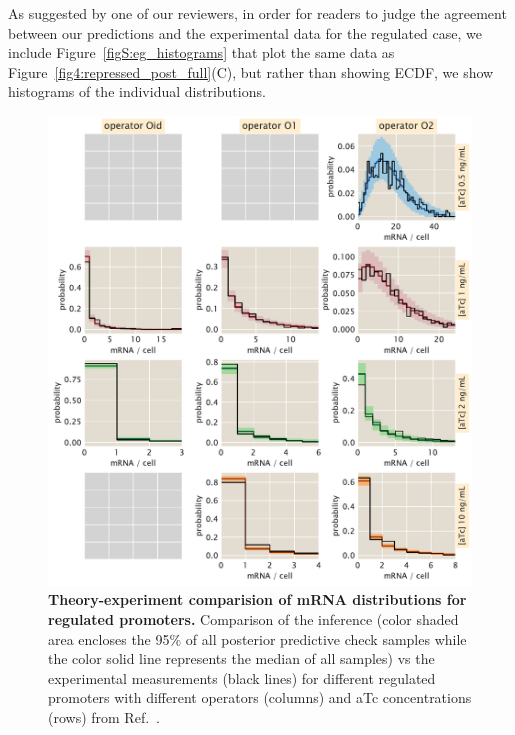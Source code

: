 As suggested by one of our reviewers, in order for readers to judge the
agreement between our predictions and the experimental data for the regulated
case, we include Figure~\ref{figS:eg_histograms} that plot the same data as
Figure~\ref{fig4:repressed_post_full}(C), but rather than showing ECDF, we show
histograms of the individual distributions.

\begin{figure}[p]
\centering
\includegraphics[width=\textwidth]{../../figures/si/figS0X_histograms.pdf}
\caption{\textbf{Theory-experiment comparision of mRNA distributions for
regulated promoters.} Comparison of the inference (color shaded area
encloses the 95\% of all posterior predictive check samples while the color
solid line represents the median of all samples) vs the experimental
measurements (black lines) for different regulated promoters with different
operators (columns) and aTc concentrations (rows) from
Ref.~\cite{Jones2014}.}
\label{figS:reg_histograms}
\end{figure}